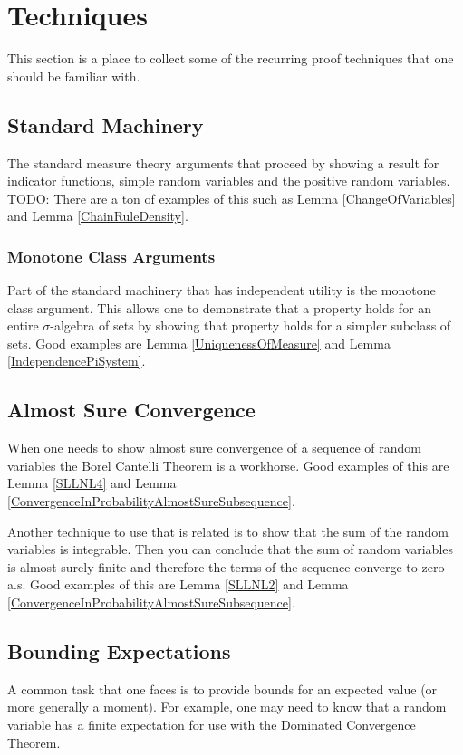 \documentclass{amsart}
\theoremstyle{remark}
\theoremstyle{definition}
\begin{document}
\section{Techniques}

This section is a place to collect some of the recurring proof
techniques that one should be familiar with.

\subsection{Standard Machinery}
The standard measure theory arguments that proceed by showing a result
for indicator functions, simple random variables and the positive
random variables.  TODO:  There are a ton of examples of this such as
Lemma \ref{ChangeOfVariables} and Lemma \ref{ChainRuleDensity}.

\subsubsection{Monotone Class Arguments}
Part of the standard machinery that has independent utility is the
monotone class argument.  This allows one to demonstrate that a
property holds for an entire $\sigma$-algebra of sets by showing that
property holds for a simpler subclass of sets.  Good examples are
Lemma \ref{UniquenessOfMeasure} and Lemma \ref{IndependencePiSystem}.

\subsection{Almost Sure Convergence}
When one needs to show almost sure convergence of a sequence of random
variables the Borel Cantelli Theorem is a workhorse.  Good examples of
this are Lemma \ref{SLLNL4} and Lemma
\ref{ConvergenceInProbabilityAlmostSureSubsequence}.

Another technique to use that is related is to show that the sum of
the random variables is integrable.  Then you can conclude that the
sum of random variables is almost surely finite and therefore the
terms of the sequence converge to zero a.s.
Good examples of
this are Lemma \ref{SLLNL2} and Lemma
\ref{ConvergenceInProbabilityAlmostSureSubsequence}.

\subsection{Bounding Expectations}

A common task that one faces is to provide bounds for an expected
value (or more generally a moment).  For example, one may need to know
that a random variable has a finite expectation for use with the
Dominated Convergence Theorem.
\end{document}
